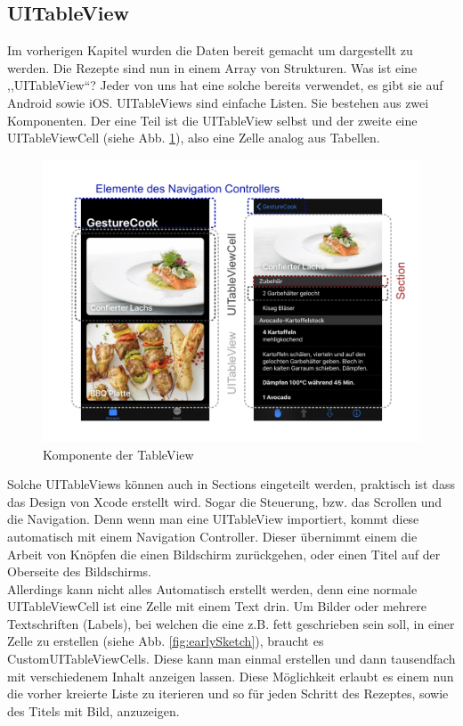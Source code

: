 \documentclass[12pt]{article}
\begin{document}
\subsection{UITableView}
Im vorherigen Kapitel wurden die Daten bereit gemacht um dargestellt zu werden. Die Rezepte sind nun in einem Array von Strukturen. Was ist eine ,,UITableView``? Jeder von uns hat eine solche bereits verwendet, es gibt sie auf Android sowie iOS. UITableViews sind einfache Listen. Sie bestehen aus zwei Komponenten. Der eine Teil ist die UITableView selbst und der zweite eine UITableViewCell (siehe Abb. \ref{fig:TableView}), also eine Zelle analog aus Tabellen. 
\begin{figure}
    \includegraphics[width=\linewidth]{pictures/TableView.jpg}
    \caption{Komponente der TableView}
    \label{fig:TableView}
\end{figure}
Solche UITableViews können auch in Sections eingeteilt werden, praktisch ist dass das Design von Xcode erstellt wird. Sogar die Steuerung, bzw. das Scrollen und die Navigation. Denn wenn man eine UITableView importiert, kommt diese automatisch mit einem Navigation Controller. Dieser übernimmt einem die Arbeit von Knöpfen die einen Bildschirm zurückgehen, oder einen Titel auf der Oberseite des Bildschirms. \\ Allerdings kann nicht alles Automatisch erstellt werden, denn eine normale UITableViewCell ist eine Zelle mit einem Text drin. Um Bilder oder mehrere Textschriften (Labels), bei welchen die eine z.B. fett geschrieben sein soll, in einer Zelle zu erstellen (siehe Abb.  \ref{fig:earlySketch}), braucht es CustomUITableViewCells. Diese kann man einmal erstellen und dann tausendfach mit verschiedenem Inhalt anzeigen lassen. Diese Möglichkeit erlaubt es einem nun die vorher kreierte Liste zu iterieren und so für jeden Schritt des Rezeptes, sowie des Titels mit Bild, anzuzeigen.  \cite{tableviewvideo} \cite{tableViewApple}
\end{document}
